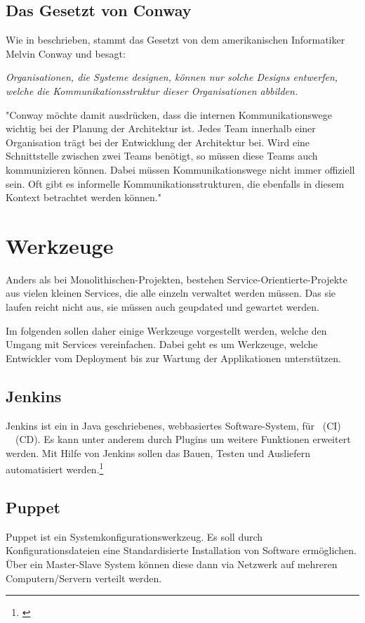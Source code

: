\subsection{Das Gesetzt von Conway}
\label{subsec:conway}
Wie in \cite[S. 39 ff.]{EWolff2016:Microservices} beschrieben, stammt das Gesetzt von dem amerikanischen Informatiker Melvin Conway und besagt:
\begin{center}
    \textit{Organisationen, die Systeme designen, können nur solche Designs entwerfen, welche die Kommunikationsstruktur dieser Organisationen abbilden.}
\end{center}
"Conway möchte damit ausdrücken, dass die internen Kommunikationswege wichtig bei der Planung der Architektur ist. Jedes Team innerhalb einer Organisation trägt bei der Entwicklung der Architektur bei. Wird eine Schnittstelle zwischen zwei Teams benötigt, so müssen diese Teams auch kommunizieren können. Dabei müssen Kommunikationswege nicht immer offiziell sein. Oft gibt es informelle Kommunikationsstrukturen, die ebenfalls in diesem Kontext betrachtet werden können." \cite[vg. S. 39]{EWolff2016:Microservices}

\section{Werkzeuge}
\label{sec:werkzeuge}
Anders als bei Monolithischen-Projekten, bestehen Service-Orientierte-Projekte aus vielen kleinen Services, die alle einzeln verwaltet werden müssen. Das sie laufen reicht nicht aus, sie müssen auch geupdated und gewartet werden.

Im folgenden sollen daher einige Werkzeuge vorgestellt werden, welche den Umgang mit Services vereinfachen. Dabei geht es um Werkzeuge, welche Entwickler vom Deployment bis zur Wartung der Applikationen unterstützen.

\subsection{Jenkins}
\label{subsec:jenkins}
Jenkins ist ein in Java geschriebenes, webbasiertes Software-System, für \ci\ (CI) \ \cd\ (CD). Es kann unter anderem durch Plugins um weitere Funktionen erweitert werden. Mit Hilfe von Jenkins sollen das Bauen, Testen und Ausliefern automatisiert werden.\footnote{\cite[vgl. S. 98 ff.]{EWolff2015:ContinuouosDelivery}}


\subsection{Puppet}
\label{subsec:puppet}
Puppet ist ein Systemkonfigurationswerkzeug. Es soll durch Konfigurationsdateien eine Standardisierte Installation von Software ermöglichen. Über ein Master-Slave System können diese dann via Netzwerk auf mehreren Computern/Servern verteilt werden.

